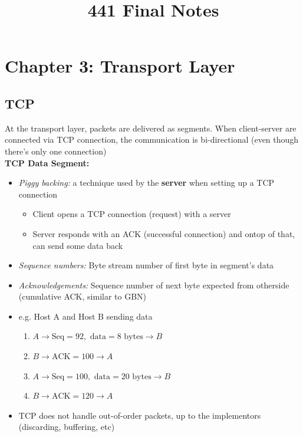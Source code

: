 \documentclass{article}
\title{441 Final Notes}
\author{}
\date{}
\begin{document}
\maketitle
\tableofcontents
\newpage

\section{Chapter 3: Transport Layer}
\subsection{TCP}
At the transport layer, packets are delivered as segments. When client-server are connected via TCP
connection, the communication is bi-directional (even though there's only one connection) \\
\textbf{TCP Data Segment:}
\begin{itemize}
    \item \textit{Piggy backing:} a technique used by the \textbf{server} when setting up a TCP
    connection
    \begin{itemize}
        \item Client opens a TCP connection (request) with a server
        \item Server responds with an ACK (successful connection) and ontop of that, can send
        some data back
    \end{itemize}
    \item \textit{Sequence numbers:} Byte stream number of first byte in segment's data
    \item \textit{Acknowledgements:} Sequence number of next byte expected from otherside (cumulative ACK,
    similar to GBN)
    \item e.g. Host A and Host B sending data
    \begin{enumerate}
        \item $A\rightarrow\text{Seq}=92,\text{ data}=8\text{ bytes}\rightarrow B$
        \item $B\rightarrow\text{ACK}=100\rightarrow A$
        \item $A\rightarrow\text{Seq}=100,\text{ data}=20\text{ bytes}\rightarrow B$
        \item $B\rightarrow\text{ACK}=120\rightarrow A$
    \end{enumerate}
    \item TCP does not handle out-of-order packets, up to the implementors (discarding, buffering, etc)
\end{itemize}
\end{document}
